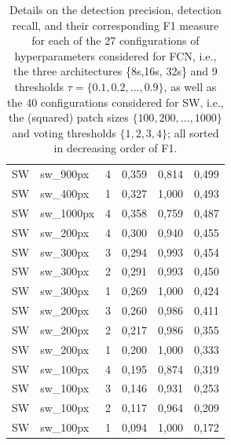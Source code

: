 \documentclass[a4paper,authoryear,review]{elsarticle}
\begin{document}
\begin{table}[]
\begin{tabular}{llllll}
		SW  & sw\_900px  & 4   & 0,359 & 0,814 & 0,499 \\
		SW  & sw\_400px  & 1   & 0,327 & 1,000 & 0,493 \\
		SW  & sw\_1000px & 4   & 0,358 & 0,759 & 0,487 \\
		SW  & sw\_200px  & 4   & 0,300 & 0,940 & 0,455 \\
		SW  & sw\_300px  & 3   & 0,294 & 0,993 & 0,454 \\
		SW  & sw\_300px  & 2   & 0,291 & 0,993 & 0,450 \\
		SW  & sw\_300px  & 1   & 0,269 & 1,000 & 0,424 \\
		SW  & sw\_200px  & 3   & 0,260 & 0,986 & 0,411 \\
		SW  & sw\_200px  & 2   & 0,217 & 0,986 & 0,355 \\
		SW  & sw\_200px  & 1   & 0,200 & 1,000 & 0,333 \\
		SW  & sw\_100px  & 4   & 0,195 & 0,874 & 0,319 \\
		SW  & sw\_100px  & 3   & 0,146 & 0,931 & 0,253 \\
		SW  & sw\_100px  & 2   & 0,117 & 0,964 & 0,209 \\
		SW  & sw\_100px  & 1   & 0,094 & 1,000 & 0,172 \\ \hline
	\end{tabular}
	\caption{Details on the detection precision,  detection recall, and their corresponding  F1  measure for each of the 27 configurations of hyperparameters considered for FCN, i.e., the three architectures \{8s,16s, 32s\} and 9 thresholds $\tau=\{0.1,0.2,...,0.9\}$, as well as the 40 configurations considered for SW, i.e., the (squared) patch sizes  $\{100,200,...,1000\}$ and voting thresholds $\{1,2,3,4\}$; all sorted in decreasing order of F1.  }
	\label{tab:TablaXX}
\end{table}
  
\end{document}
